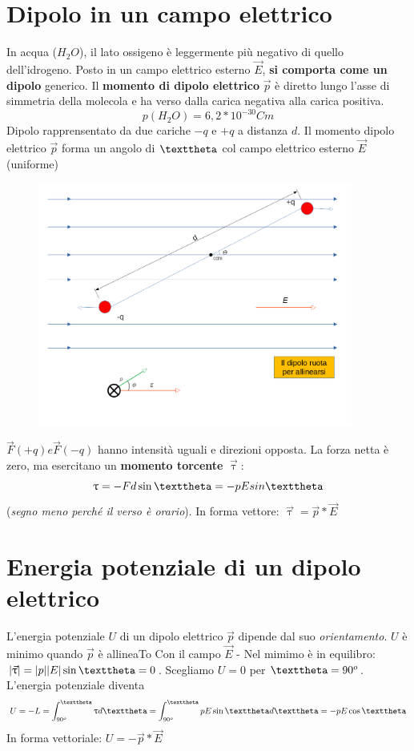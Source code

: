 \documentclass{book}
\newcommand{\abs}[1]{\lvert#1\rvert}
\begin{document}
\section{Dipolo in un campo elettrico}
In acqua ($H_2O$), il lato ossigeno è leggermente più negativo di quello dell'idrogeno. Posto in un campo
elettrico esterno $\vec{E}$, \textbf{si comporta come un dipolo} generico. Il \textbf{momento di dipolo elettrico} $\vec{p}$ è diretto lungo l'asse di simmetria della molecola e ha verso dalla carica negativa alla carica positiva.
\begin{equation}
  p(H_2O)=6,2*10^{-30}Cm
\end{equation}
Dipolo rapprensentato da due cariche $-q$ e $+q$ a distanza $d$. Il momento dipolo elettrico
$\vec{p}$ forma un angolo di $\texttheta$ col campo elettrico esterno $\vec{E}$ (uniforme)\\
\begin{figure}[!h]
 	\centering
	\includegraphics[height=8cm]{img/grafuci del dipolo elettrico.png}
\end{figure}
$\vec{F} (+q) e \vec{F} (-q)$ hanno intensità uguali e direzioni opposta. La forza netta è zero, ma esercitano un \textbf{momento torcente} $\vec{\uptau}$:
\begin{equation}
\uptau=-Fd \sin {\texttheta} = -pE sin {\texttheta}
\end{equation}
(\textit{segno meno perché il verso è orario}).
In forma vettore: $\vec{\uptau}=\vec{p}*\vec{E}$
\section{Energia potenziale di un dipolo elettrico}
L'energia potenziale $U$ di un dipolo elettrico $\vec{p}$ dipende dal suo \textit{orientamento}.
$U$ è minimo quando $\vec{p}$ è allineaTo Con il campo $\vec{E}$ - Nel mimimo è in equilibro:
$\abs{\vec{\uptau}}=\abs{p}\abs{E}\sin \texttheta=0$. Scegliamo $U=0$ per $\texttheta=90^o$.\\
L'energia potenziale diventa
\begin{equation}
  U=-L=\int^{\texttheta}_{90^o}\uptau d \texttheta= \int^{\texttheta}_{90^o} pE\sin \texttheta d\texttheta =-pE\cos\texttheta
\end{equation}
In forma vettoriale: $U=-\vec{p}*\vec{E}$
\end{document}
